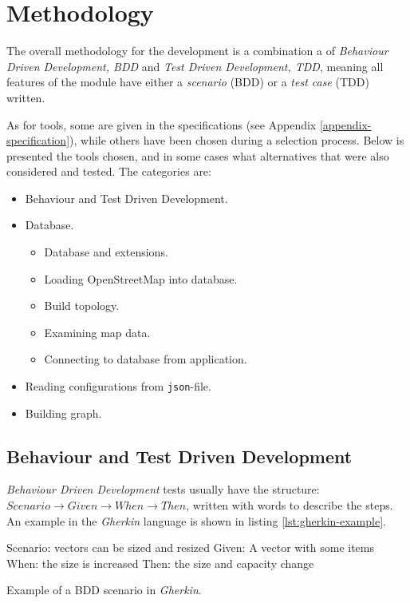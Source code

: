 \documentclass[../main.tex]{subfiles}
\begin{document}
\chapter{Methodology}
The overall methodology for the development is a combination a of \emph{Behaviour Driven Development, BDD} and \emph{Test Driven Development, TDD}, meaning all features of the module have either a \emph{scenario} (BDD) or a \emph{test case} (TDD) written.

\vspace{1em}
\noindent
As for tools, some are given in the specifications (see Appendix \ref{appendix-specification}), while others have been chosen during a selection process. Below is presented the tools chosen, and in some cases what alternatives that were also considered and tested. The categories are:

\begin{itemize}
    \item Behaviour and Test Driven Development.
    \item Database.
    \begin{itemize}
        \item Database and extensions.
        \item Loading OpenStreetMap into database.
        \item Build topology.
        \item Examining map data.
        \item Connecting to database from application.
    \end{itemize}
    \item Reading configurations from \texttt{json}-file.
    \item Building graph.
\end{itemize}


\section{Behaviour and Test Driven Development}
\emph{Behaviour Driven Development} tests usually have the structure: 
$Scenario \rightarrow Given \rightarrow When \rightarrow Then$, written with words to describe the steps. An example in the \emph{Gherkin} language is shown in listing \ref{lst:gherkin-example}.

\begin{mylisting}
\begin{gherkincode}
Scenario: vectors can be sized and resized
     Given: A vector with some items
     When:  the size is increased
     Then:  the size and capacity change
\end{gherkincode}
\caption{Example of a BDD scenario in \emph{Gherkin}.}
\label{lst:gherkin-example}
\end{mylisting}
\end{document}
